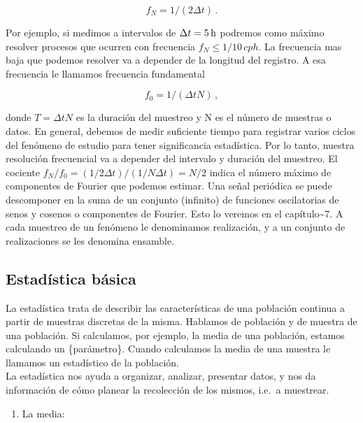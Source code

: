\documentclass[
]{agujournal2019}
\providecommand{\tightlist}{%
  \setlength{\itemsep}{0pt}\setlength{\parskip}{0pt}}\usepackage{longtable,booktabs,array}
\begin{document}
\[f_N=1/(2\Delta{t})\,.\]

Por ejemplo, si medimos a intervalos de \(\Delta{t}=5\,{\rm h}\)
podremos como máximo resolver procesos que ocurren con frecuencia
\(f_N\le1/10\,{ cph}\). La frecuencia mas baja que podemos resolver va a
depender de la longitud del registro. A esa frecuencia le llamamos
frecuencia fundamental

\[f_0=1/(\Delta{t}N)\,,\]

donde \(T=\Delta{t} N\) es la duración del muestreo y N es el número de
muestras o datos. En general, debemos de medir suficiente tiempo para
registrar varios ciclos del fenómeno de estudio para tener significancia
estadística. Por lo tanto, nuestra resolución frecuencial va a depender
del intervalo y duración del muestreo. El cociente
\(f_N/f_0=(1/2\Delta{t})/(1/N\Delta{t})=N/2\) indica el número máximo de
componentes de Fourier que podemos estimar. Una señal periódica se puede
descomponer en la suma de un conjunto (infinito) de funciones
oscilatorias de senos y cosenos o componentes de Fourier. Esto lo
veremos en el capítulo\textasciitilde7. A cada muestreo de un fenómeno
le denominamos realización, y a un conjunto de realizaciones se les
denomina ensamble.

\hypertarget{estaduxedstica-buxe1sica}{%
\subsection{Estadística básica}\label{estaduxedstica-buxe1sica}}

La estadística trata de describir las características de una población
continua a partir de muestras discretas de la misma. Hablamos de
población y de muestra de una población. Si calculamos, por ejemplo, la
media de una población, estamos calculando un \{parámetro\}. Cuando
calculamos la media de una muestra le llamamos un estadístico de la
población.\\

La estadística nos ayuda a organizar, analizar, presentar datos, y nos
da información de cómo planear la recolección de los mismos, i.e.~a
muestrear.

\begin{center}
\end{center}

\vspace{0.5cm}

\begin{enumerate}
\def\labelenumi{\arabic{enumi}.}
\tightlist
\item
  La media:\\
\end{enumerate}
\end{document}
